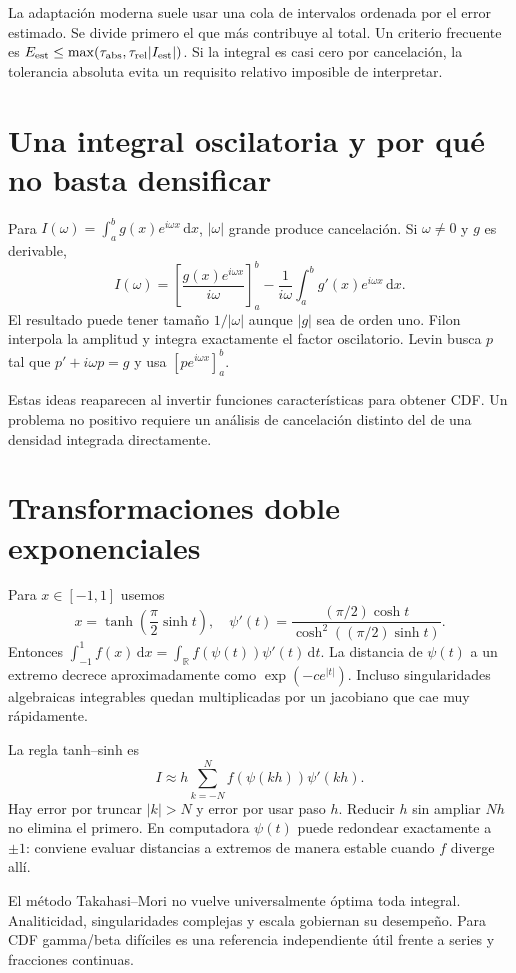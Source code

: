\documentclass[11pt,a4paper]{article}
\newcommand{\R}{\mathbb R}
\newcommand{\dd}{\,\mathrm d}
\theoremstyle{definition}
\newcounter{problema}
\begin{document}
La adaptación moderna suele usar una cola de intervalos ordenada por el error estimado. Se divide primero el que más contribuye al total. Un criterio frecuente es
$E_{\rm est}\le\max(\tau_{\rm abs},\tau_{\rm rel}|I_{\rm est}|)$.
Si la integral es casi cero por cancelación, la tolerancia absoluta evita un requisito relativo imposible de interpretar.

\section{Una integral oscilatoria y por qué no basta densificar}
Para $I(\omega)=\int_a^b g(x)e^{i\omega x}\dd x$, $|\omega|$ grande produce cancelación. Si $\omega\ne0$ y $g$ es derivable,
\[
I(\omega)=\left[\frac{g(x)e^{i\omega x}}{i\omega}\right]_a^b
-\frac1{i\omega}\int_a^b g'(x)e^{i\omega x}\dd x.
\]
El resultado puede tener tamaño $1/|\omega|$ aunque $|g|$ sea de orden uno. Filon interpola la amplitud y integra exactamente el factor oscilatorio. Levin busca $p$ tal que $p'+i\omega p=g$ y usa $[pe^{i\omega x}]_a^b$.

Estas ideas reaparecen al invertir funciones características para obtener CDF. Un problema no positivo requiere un análisis de cancelación distinto del de una densidad integrada directamente.

\section{Transformaciones doble exponenciales}
Para $x\in[-1,1]$ usemos
\[
x=\tanh\left(\frac\pi2\sinh t\right),\quad
\psi'(t)=\frac{(\pi/2)\cosh t}
{\cosh^2((\pi/2)\sinh t)}.
\]
Entonces $\int_{-1}^1f(x)\dd x=\int_\R f(\psi(t))\psi'(t)\dd t$. La distancia de $\psi(t)$ a un extremo decrece aproximadamente como $\exp(-c e^{|t|})$. Incluso singularidades algebraicas integrables quedan multiplicadas por un jacobiano que cae muy rápidamente.

La regla tanh--sinh es
\[
I\approx h\sum_{k=-N}^N f(\psi(kh))\psi'(kh).
\]
Hay error por truncar $|k|>N$ y error por usar paso $h$. Reducir $h$ sin ampliar $Nh$ no elimina el primero. En computadora $\psi(t)$ puede redondear exactamente a $\pm1$: conviene evaluar distancias a extremos de manera estable cuando $f$ diverge allí.

El método Takahasi--Mori no vuelve universalmente óptima toda integral. Analiticidad, singularidades complejas y escala gobiernan su desempeño. Para CDF gamma/beta difíciles es una referencia independiente útil frente a series y fracciones continuas.
\end{document}

